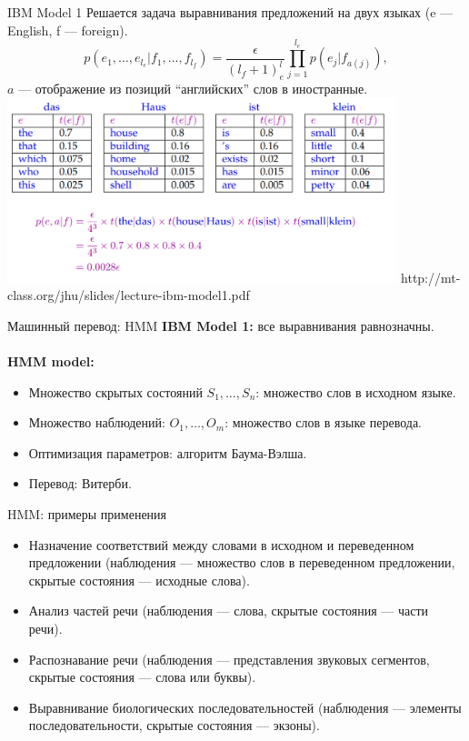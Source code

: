 \begin{frame}{IBM Model 1}
Решается задача выравнивания предложений на двух языках (e --- English, f --- foreign).
\[
    p(e_1, \dots, e_{l_e}|f_1, \dots, f_{l_f}) = \frac{\epsilon}{(l_f+1)^l_e} \prod_{j=1}^{l_e} p(e_j|f_{a(j)}),
\]
$a$ ---  отображение из позиций ``английских'' слов в иностранные.
\includegraphics[width=0.85\textwidth]{koehn.png}
\footnotesize
\quad http://mt-class.org/jhu/slides/lecture-ibm-model1.pdf
\end{frame}



\begin{frame}{Машинный перевод: HMM}
\textbf{IBM Model 1:} все выравнивания равнозначны.\\
~\\
\textbf{HMM model:} 
\begin{itemize}
\item Множество скрытых состояний $S_1,\dots,S_n$: множество слов в исходном языке.
\item Множество наблюдений: $O_1,\dots,O_m$: множество слов в языке перевода.
\item Оптимизация параметров: алгоритм Баума-Вэлша.
\item Перевод: Витерби.
\end{itemize}
\end{frame}

\fi 

\begin{frame}{HMM: примеры применения}
\begin{itemize}
\item Назначение соответствий между словами в исходном и переведенном предложении (наблюдения --- множество слов в переведенном предложении, скрытые состояния --- исходные слова). 
\item Анализ частей речи (наблюдения --- слова, скрытые состояния --- части речи).
\item Распознавание речи (наблюдения --- представления звуковых сегментов, скрытые состояния --- слова или буквы).
\item Выравнивание биологических последовательностей (наблюдения --- элементы последовательности, скрытые состояния --- экзоны).
\end{itemize}
\end{frame}

